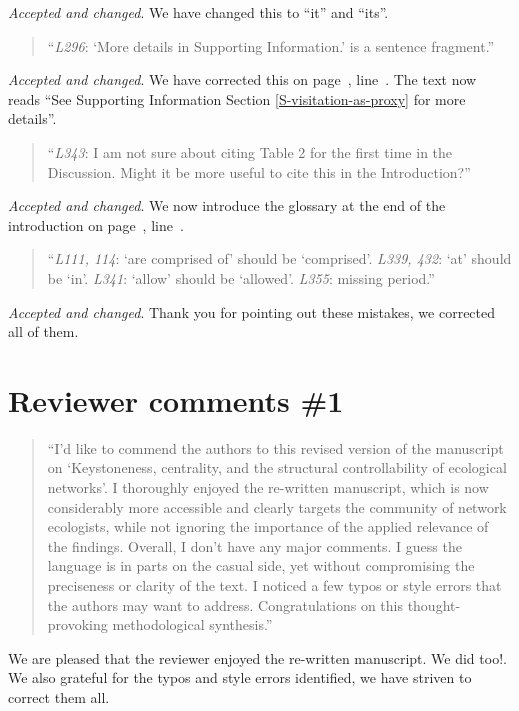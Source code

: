 \documentclass[a4paper]{artikel1}
\newcommand{\lr}[1]{page~\pageref{#1}, line~\lineref{#1}}
\theoremstyle{definition}
\theoremstyle{definition}
\theoremstyle{definition}
\theoremstyle{remark}
\begin{document}
\emph{Accepted and changed}. We have changed this to ``it'' and ``its''.

\begin{quote}
``\emph{L296}: `More details in Supporting Information.' is a sentence
fragment.''
\end{quote}

\emph{Accepted and changed}. We have corrected this on
\lr{M-R2-sentence-fragment}. The text now reads ``See Supporting
Information Section \ref{S-visitation-as-proxy} for more details''.

\begin{quote}
``\emph{L343}: I am not sure about citing Table 2 for the first time in
the Discussion. Might it be more useful to cite this in the
Introduction?''
\end{quote}

\emph{Accepted and changed}. We now introduce the glossary at the end of
the introduction on \lr{M-R2-ref-glossary}.

\begin{quote}
``\emph{L111, 114}: `are comprised of' should be `comprised'.
\emph{L339, 432}: `at' should be `in'. \emph{L341}: `allow' should be
`allowed'. \emph{L355}: missing period.''
\end{quote}

\emph{Accepted and changed}. Thank you for pointing out these mistakes,
we corrected all of them.

\section{Reviewer comments \#1}\label{reviewer-comments-1}

\begin{quote}
``I'd like to commend the authors to this revised version of the
manuscript on `Keystoneness, centrality, and the structural
controllability of ecological networks'. I thoroughly enjoyed the
re-written manuscript, which is now considerably more accessible and
clearly targets the community of network ecologists, while not ignoring
the importance of the applied relevance of the findings. Overall, I
don't have any major comments. I guess the language is in parts on the
casual side, yet without compromising the preciseness or clarity of the
text. I noticed a few typos or style errors that the authors may want to
address. Congratulations on this thought-provoking methodological
synthesis.''
\end{quote}

We are pleased that the reviewer enjoyed the re-written manuscript. We
did too!. We also grateful for the typos and style errors identified, we
have striven to correct them all.
\end{document}
